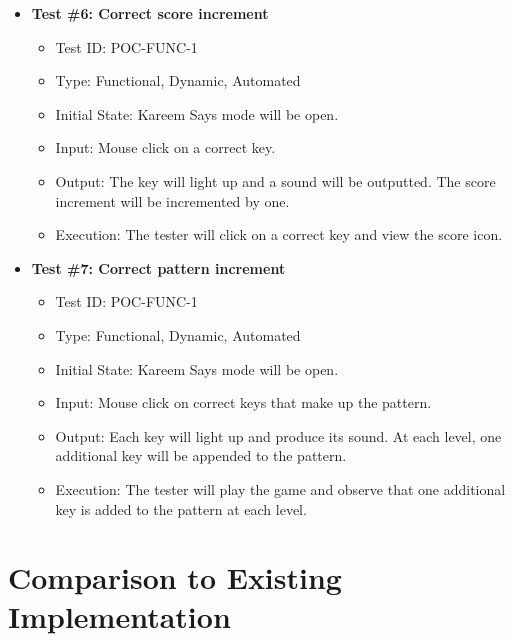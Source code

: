 \documentclass[12pt, titlepage]{article}
\begin{document}
\begin{itemize}

\item \textbf{Test \#6: Correct score increment}
\begin{itemize}
\item Test ID: POC-FUNC-1
\item Type: Functional, Dynamic, Automated  		
\item Initial State: Kareem Says mode will be open. 					
\item Input: Mouse click on a correct key.  					
\item Output: The key will light up and a sound will be outputted. The score increment will be incremented by one.				
\item Execution: The tester will click on a correct key and view the score icon.  
\end{itemize}

\item \textbf{Test \#7: Correct pattern increment}
\begin{itemize}
\item Test ID: POC-FUNC-1
\item Type: Functional, Dynamic, Automated		
\item Initial State: Kareem Says mode will be open.					
\item Input: Mouse click on correct keys that make up the pattern. 		
\item Output: Each key will light up and produce its sound. At each level, one additional key will be appended to the pattern. 			
\item Execution: The tester will play the game and observe that one additional key is added to the pattern at each level.
\end{itemize}



\end{itemize}

	
\section{Comparison to Existing Implementation}	
\end{document}
